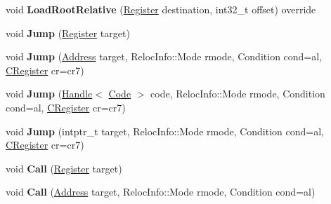 \begin{DoxyCompactItemize}
\item 
\mbox{\label{classv8_1_1internal_1_1TurboAssembler_a77e9d10255bc9a25985ff71df883e665}} 
void {\bfseries Load\+Root\+Relative} (\mbox{\hyperlink{classv8_1_1internal_1_1Register}{Register}} destination, int32\+\_\+t offset) override
\item 
\mbox{\label{classv8_1_1internal_1_1TurboAssembler_add9211266167b473927df81a33546253}} 
void {\bfseries Jump} (\mbox{\hyperlink{classv8_1_1internal_1_1Register}{Register}} target)
\item 
\mbox{\label{classv8_1_1internal_1_1TurboAssembler_a109e655ef89fb66603321ba15c0d0621}} 
void {\bfseries Jump} (\mbox{\hyperlink{classuintptr__t}{Address}} target, Reloc\+Info\+::\+Mode rmode, Condition cond=al, \mbox{\hyperlink{classv8_1_1internal_1_1CRegister}{C\+Register}} cr=cr7)
\item 
\mbox{\label{classv8_1_1internal_1_1TurboAssembler_ab475c13c45cb39e7966afcdff7215901}} 
void {\bfseries Jump} (\mbox{\hyperlink{classv8_1_1internal_1_1Handle}{Handle}}$<$ \mbox{\hyperlink{classv8_1_1internal_1_1Code}{Code}} $>$ code, Reloc\+Info\+::\+Mode rmode, Condition cond=al, \mbox{\hyperlink{classv8_1_1internal_1_1CRegister}{C\+Register}} cr=cr7)
\item 
\mbox{\label{classv8_1_1internal_1_1TurboAssembler_a428e313c2b1c1a080219b887746b7f7c}} 
void {\bfseries Jump} (intptr\+\_\+t target, Reloc\+Info\+::\+Mode rmode, Condition cond=al, \mbox{\hyperlink{classv8_1_1internal_1_1CRegister}{C\+Register}} cr=cr7)
\item 
\mbox{\label{classv8_1_1internal_1_1TurboAssembler_acd7e5c487db1d9b1444e1f72865677f7}} 
void {\bfseries Call} (\mbox{\hyperlink{classv8_1_1internal_1_1Register}{Register}} target)
\item 
\mbox{\label{classv8_1_1internal_1_1TurboAssembler_a8959a108f8a17a46c7b8b60a18b407fc}} 
void {\bfseries Call} (\mbox{\hyperlink{classuintptr__t}{Address}} target, Reloc\+Info\+::\+Mode rmode, Condition cond=al)

\end{DoxyCompactItemize}
